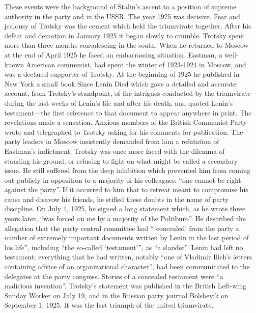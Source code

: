 These events were the background of Stalin's ascent to a position of supreme authority in the party and in the USSR. The year 1925 was decisive. Fear and jealousy of Trotsky was the cement which held the triumvirate together. After his defeat and demotion in January 1925 it began slowly to crumble. Trotsky spent more than three months convalescing in the south. When he returned to Moscow at the end of April 1925 he faced an embarrassing situation. Eastman, a well-known American communist, had spent the winter of 1923-1924 in Moscow, and was a declared supporter of Trotsky. At the beginning of 1925 he published in New York a small book Since Lenin Died which gave a detailed and accurate account, from Trotsky's standpoint, of the intrigues conducted by the triumvirate during the last weeks of Lenin's life and after his death, and quoted Lenin's testament---the first reference to that document to appear anywhere in print. The revelations made a sensation. Anxious members of the British Communist Party wrote and telegraphed to Trotsky asking for his comments for publication. The party leaders in Moscow insistently demanded from him a refutation of Eastman's indictment. Trotsky was once more faced with the dilemma of standing his ground, or refusing to fight on what might be called a secondary issue. He still suffered from the deep inhibition which prevented him from coming out publicly in opposition to a majority of his colleagues: ``one cannot be right against the party''. If it occurred to him that to retreat meant to compromise his cause and disavow his friends, he stifled these doubts in the name of party discipline. On July 1, 1925, he signed a long statement which, as he wrote three years later, ``was forced on me by a majority of the Politburo''. He described the allegation that the party central committee had ```concealed' from the party a number of extremely important documents written by Lenin in the last period of his life'', including ``the so-called `testament''', as ``a slander''. Lenin had left no testament; everything that he had written, notably ``one of Vladimir Ilich's letters containing advice of an organizational character'', had been communicated to the delegates at the party congress. Stories of a concealed testament were ``a malicious invention''. Trotsky's statement was published in the British Left-wing Sunday Worker on July 19, and in the Russian party journal Bolshevik on September 1, 1925. It was the last triumph of the united triumvirate. 

